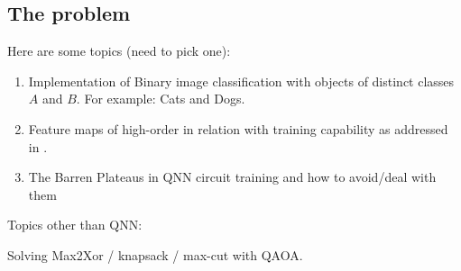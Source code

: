 \subsection{The problem}
Here are some topics (need to pick one):
\begin{enumerate}
    \item Implementation of Binary image classification with objects of distinct classes $A$ and $B$. For example: Cats and Dogs.
    \item Feature maps of high-order in relation with training capability as addressed in \cite{abbasPowerQuantumNeural2021}.
    \item The Barren Plateaus in QNN circuit training and how to avoid/deal with them
\end{enumerate}

Topics other than QNN:

Solving Max2Xor / knapsack / max-cut with QAOA.
